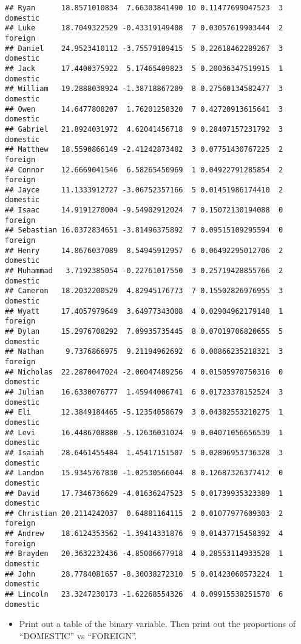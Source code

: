 \documentclass[
]{article}
\providecommand{\tightlist}{%
  \setlength{\itemsep}{0pt}\setlength{\parskip}{0pt}}
\begin{document}
\begin{verbatim}
## Ryan      18.8571010834  7.66303841490 10 0.11477699047523  3 domestic
## Luke      18.7049322529 -0.43319149408  7 0.03057619903444  2  foreign
## Daniel    24.9523410112 -3.75579109415  5 0.22618462289267  3 domestic
## Jack      17.4400375922  5.17465409823  5 0.20036347519915  1 domestic
## William   19.2888038924 -1.38718867209  8 0.27560134582477  3 domestic
## Owen      14.6477808207  1.76201258320  7 0.42720913615641  3 domestic
## Gabriel   21.8924031972  4.62041456718  9 0.28407157231792  3 domestic
## Matthew   18.5590866149 -2.41242873482  3 0.07751430767225  2  foreign
## Connor    12.6669041546  6.58265450969  1 0.04922791285854  2  foreign
## Jayce     11.1333912727 -3.06752357166  5 0.01451986174410  2 domestic
## Isaac     14.9191270004 -9.54902912024  7 0.15072130194088  0  foreign
## Sebastian 16.0372834651 -3.81496375892  7 0.09515109295594  0  foreign
## Henry     14.8676037089  8.54945912957  6 0.06492295012706  2 domestic
## Muhammad   3.7192385054 -0.22761017550  3 0.25719428855766  2 domestic
## Cameron   18.2032200529  4.82945176773  7 0.15502826976955  3 domestic
## Wyatt     17.4057979649  3.64977343008  4 0.02904962179148  1  foreign
## Dylan     15.2976708292  7.09935735445  8 0.07019706820655  5 domestic
## Nathan     9.7376866975  9.21194962692  6 0.00866235218321  3  foreign
## Nicholas  22.2870047024 -2.00047489256  4 0.01505970750316  0 domestic
## Julian    16.6330076777  1.45944006741  6 0.01723378152524  3 domestic
## Eli       12.3849184465 -5.12354058679  3 0.04382553210275  1 domestic
## Levi      16.4486708880 -5.12636031024  9 0.04071056656539  1 domestic
## Isaiah    28.6461455484  1.45417151507  5 0.02896953736328  3 domestic
## Landon    15.9345767830 -1.02530566044  8 0.12687326377412  0 domestic
## David     17.7346736629 -4.01636247523  5 0.01739935323389  1 domestic
## Christian 20.2114242037  0.64881164115  2 0.01077977609303  2  foreign
## Andrew    18.6124353562 -1.39414331876  9 0.01437715458392  4  foreign
## Brayden   20.3632232436 -4.85006677918  4 0.28553114933528  1 domestic
## John      28.7784081657 -8.30038272310  5 0.01423060573224  1 domestic
## Lincoln   23.3247230173 -1.62268554326  4 0.09915538251570  6 domestic
\end{verbatim}

\begin{itemize}
\tightlist
\item
  Print out a table of the binary variable. Then print out the
  proportions of ``DOMESTIC'' vs ``FOREIGN''.
\end{itemize}
\end{document}
